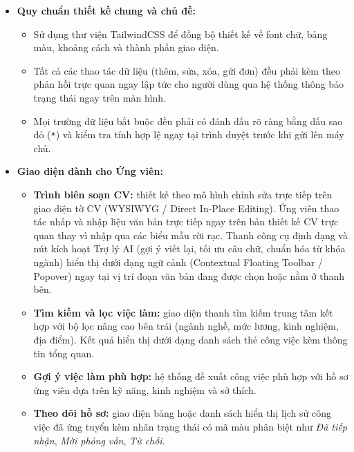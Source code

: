 \begin{itemize}
    \item \textbf{Quy chuẩn thiết kế chung và chủ đề:}
    \begin{itemize}
        \item Sử dụng thư viện TailwindCSS để đồng bộ thiết kế về font chữ, bảng màu, khoảng cách và thành phần giao diện.
        \item Tất cả các thao tác dữ liệu (thêm, sửa, xóa, gửi đơn) đều phải kèm theo phản hồi trực quan ngay lập tức cho người dùng qua hệ thống thông báo trạng thái ngay trên màn hình.
        \item Mọi trường dữ liệu bắt buộc đều phải có đánh dấu rõ ràng bằng dấu sao đỏ (\texttt{*}) và kiểm tra tính hợp lệ ngay tại trình duyệt trước khi gửi lên máy chủ.
    \end{itemize}

    \item \textbf{Giao diện dành cho Ứng viên:}
    \begin{itemize}
        \item \textbf{Trình biên soạn CV:} thiết kế theo mô hình chỉnh sửa trực tiếp trên giao diện tờ CV (WYSIWYG / Direct In-Place Editing). Ứng viên thao tác nhấp và nhập liệu văn bản trực tiếp ngay trên bản thiết kế CV trực quan thay vì nhập qua các biểu mẫu rời rạc. Thanh công cụ định dạng và nút kích hoạt Trợ lý AI (gợi ý viết lại, tối ưu câu chữ, chuẩn hóa từ khóa ngành) hiển thị dưới dạng ngữ cảnh (Contextual Floating Toolbar / Popover) ngay tại vị trí đoạn văn bản đang được chọn hoặc nằm ở thanh bên.
        \item \textbf{Tìm kiếm và lọc việc làm:} giao diện thanh tìm kiếm trung tâm kết hợp với bộ lọc nâng cao bên trái (ngành nghề, mức lương, kinh nghiệm, địa điểm). Kết quả hiển thị dưới dạng danh sách thẻ công việc kèm thông tin tổng quan.
        \item \textbf{Gợi ý việc làm phù hợp:} hệ thống đề xuất công việc phù hợp với hồ sơ ứng viên dựa trên kỹ năng, kinh nghiệm và sở thích.
        \item \textbf{Theo dõi hồ sơ:} giao diện bảng hoặc danh sách hiển thị lịch sử công việc đã ứng tuyển kèm nhãn trạng thái có mã màu phân biệt như \textit{Đã tiếp nhận}, \textit{Mời phỏng vấn}, \textit{Từ chối}.
    \end{itemize}


\end{itemize}
